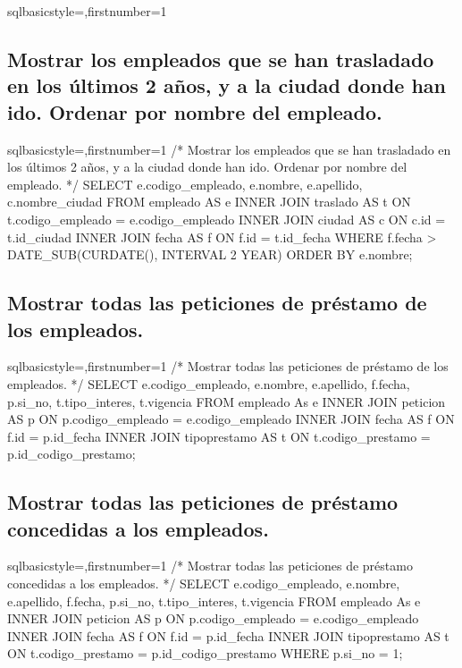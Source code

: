 \begin{sourcecodep}[]{sql}{basicstyle={\fontsize{10}{10}\selectfont\ttfamily},firstnumber=1}{}
	\subsection{Mostrar los empleados que se han trasladado en los últimos 2 años, y a la ciudad donde han ido. Ordenar por nombre del empleado.}
		\begin{sourcecodep}[]{sql}{basicstyle={\fontsize{10}{10}\selectfont\ttfamily},firstnumber=1}{}
			/* Mostrar los empleados que se han trasladado en los últimos 2 años, y a la ciudad donde han ido. Ordenar por nombre del empleado. */
			SELECT e.codigo_empleado, e.nombre, e.apellido, c.nombre_ciudad FROM empleado AS e
				INNER JOIN traslado AS t ON t.codigo_empleado = e.codigo_empleado
				INNER JOIN ciudad AS c ON c.id = t.id_ciudad
				INNER JOIN fecha AS f ON f.id = t.id_fecha
				WHERE f.fecha > DATE_SUB(CURDATE(), INTERVAL 2 YEAR)
				ORDER BY e.nombre;\end{sourcecodep}
	\subsection{Mostrar todas las peticiones de préstamo de los empleados.}
		\begin{sourcecodep}[]{sql}{basicstyle={\fontsize{10}{10}\selectfont\ttfamily},firstnumber=1}{}
			/* Mostrar todas las peticiones de préstamo de los empleados. */
			SELECT e.codigo_empleado, e.nombre, e.apellido, f.fecha, p.si_no, t.tipo_interes, t.vigencia FROM empleado As e
				INNER JOIN peticion AS p ON p.codigo_empleado = e.codigo_empleado
				INNER JOIN fecha AS f ON f.id = p.id_fecha
				INNER JOIN tipoprestamo AS t ON t.codigo_prestamo = p.id_codigo_prestamo;\end{sourcecodep}
\newpage
	\subsection{Mostrar todas las peticiones de préstamo concedidas a los empleados.}
		\begin{sourcecodep}[]{sql}{basicstyle={\fontsize{10}{10}\selectfont\ttfamily},firstnumber=1}{}
			/* Mostrar todas las peticiones de préstamo concedidas a los empleados. */
			SELECT e.codigo_empleado, e.nombre, e.apellido, f.fecha, p.si_no, t.tipo_interes, t.vigencia FROM empleado As e
				INNER JOIN peticion AS p ON p.codigo_empleado = e.codigo_empleado
				INNER JOIN fecha AS f ON f.id = p.id_fecha
				INNER JOIN tipoprestamo AS t ON t.codigo_prestamo = p.id_codigo_prestamo
				WHERE p.si_no = 1;\end{sourcecodep}

\end{sourcecodep}
